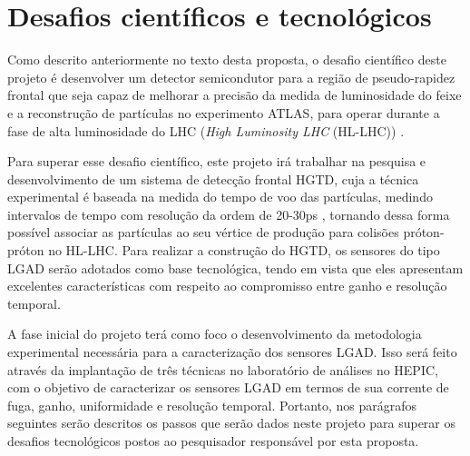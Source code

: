 \chapter{Desafios científicos e tecnológicos}

Como descrito anteriormente no texto desta proposta, o desafio científico deste projeto é desenvolver um detector semicondutor para a região de pseudo-rapidez frontal que seja capaz de melhorar a precisão da medida de luminosidade do feixe e a reconstrução de partículas no experimento ATLAS, para operar durante a fase de alta luminosidade do LHC ({\it High Luminosity LHC} (HL-LHC)) \cite{HL_LHC,tdr}. 

Para superar esse desafio científico, este projeto irá trabalhar na pesquisa e desenvolvimento de um sistema de detecção frontal HGTD, cuja a técnica experimental é baseada na medida do tempo de voo das partículas, medindo intervalos de tempo com resolução da ordem de 20-30ps \cite{tdr}, tornando dessa forma possível associar as partículas ao seu vértice de produção para colisões próton-próton no HL-LHC. Para realizar a construção do HGTD, os sensores do tipo LGAD serão adotados como base tecnológica, tendo em vista que eles apresentam excelentes características com respeito ao compromisso entre ganho e resolução temporal. 

A fase inicial do projeto terá como foco o desenvolvimento da metodologia experimental necessária para a caracterização dos sensores LGAD. Isso será feito através da implantação de três técnicas no laboratório de análises no HEPIC, com o objetivo de caracterizar os sensores LGAD em termos de sua corrente de fuga, ganho, uniformidade e resolução temporal. Portanto, nos parágrafos seguintes serão descritos os passos que serão dados neste projeto para superar os desafios tecnológicos postos ao pesquisador responsável por esta proposta. 


